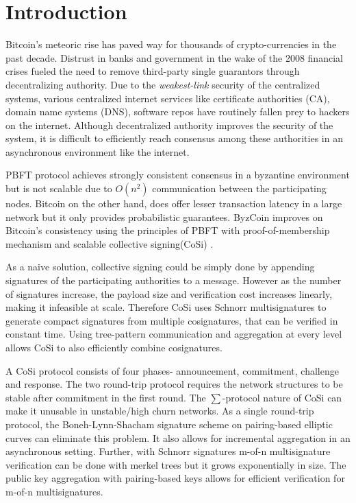 \section{Introduction}



Bitcoin's\cite{bitcoin} meteoric rise has paved way for thousands of crypto-currencies in the past decade. Distrust in banks and government in the wake of the 2008 financial crises fueled the need to remove third-party single guarantors through decentralizing authority. Due to the \textit{weakest-link} security of the centralized systems, various centralized internet services like certificate authorities (CA), domain name systems (DNS), software repos have routinely fallen prey to hackers on the internet. Although decentralized authority improves the security of the system, it is difficult to efficiently reach consensus among these authorities in an asynchronous environment like the internet.

PBFT protocol \cite{PBFT} achieves strongly consistent consensus in a byzantine environment but is not scalable due to $O(n^2)$ communication between the participating nodes. Bitcoin  on the other hand, does offer lesser transaction latency in a large network but it only provides probabilistic guarantees. ByzCoin\cite{byzcoin} improves on Bitcoin's consistency using the principles of PBFT with proof-of-membership mechanism and scalable collective signing(CoSi) \cite{cosi}.

As a naive solution, collective signing could be simply done by appending signatures of the participating authorities to a message. However as the number of signatures increase, the payload size and verification cost increases linearly, making it infeasible at scale. Therefore CoSi uses Schnorr multisignatures\cite{schnorr} to generate compact signatures from multiple cosignatures, that can be verified in constant time. Using tree-pattern communication and aggregation at every level allows CoSi to also efficiently combine cosignatures.

A CoSi protocol consists of four phases- announcement, commitment, challenge and response. The two round-trip protocol requires the network structures to be stable after commitment in the first round. The $\sum$-protocol nature of CoSi can make it unusable in unstable/high churn networks. As a single round-trip protocol, the Boneh-Lynn-Shacham signature scheme \cite{bls} on pairing-based elliptic curves can eliminate this problem. It also allows for incremental aggregation in an asynchronous setting. Further, with Schnorr signatures m-of-n multisignature verification can be done with merkel trees\cite{merkel} but it grows exponentially in size. The public key aggregation with pairing-based keys allows for efficient verification for m-of-n multisignatures.

